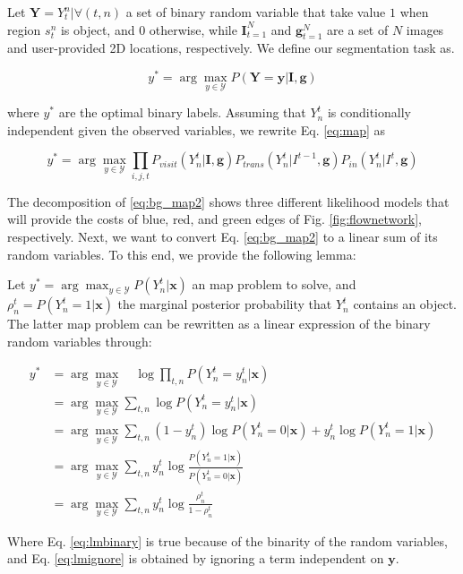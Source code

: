 Let $\bm{Y}={Y^{n}_{t}|\forall(t,n)}$ a set of binary random variable that take value $1$ when region $s^{n}_{t}$ is object, and $0$ otherwise, while $\bm{I}_{t=1}^{N}$ and $\bm{g}_{t=1}^{N}$ are a set of $N$ images and user-provided 2D locations, respectively.
We define our segmentation task as.

\begin{equation}
  \label{eq:map}
  y^{*} = \arg \max_{y \in \mathcal{Y}}P(\bm{Y}=\bm{y}|\bm{I}, \bm{g})
\end{equation}

where $y^{*}$ are the optimal binary labels.
Assuming that $Y^{t}_{n}$ is conditionally independent given the observed variables, we rewrite Eq. \ref{eq:map} as

\begin{equation}
  \label{eq:bg_map2}
  y^{*} = \arg \max_{y \in \mathcal{Y}}\prod_{i,j,t} P_{visit}(Y^{t}_{n}|\bm{I}, \bm{g}) P_{trans}(Y^{t}_{n}|I^{t-1},\bm{g}) P_{in}(Y^{t}_{n}|I^{t},\bm{g})
\end{equation}

The decomposition of \ref{eq:bg_map2} shows three different likelihood models that will provide the costs of blue, red, and green edges of Fig. \ref{fig:flownetwork}, respectively.
Next, we want to convert Eq. \ref{eq:bg_map2} to a linear sum of its random variables.
To this end, we provide the following lemma:

\begin{lemma}
  \label{lm:linprog}
  Let $y^{*}=\arg\max_{y\in\mathcal{Y}}P(Y^{t}_{n}|\bm{x})$ an \gls{map} problem to solve, and $\rho^{t}_{n}=P(Y^{t}_{n}=1|\bm{x})$ the marginal posterior probability that $Y^{t}_{n}$ contains an object.
  The latter \gls{map} problem can be rewritten as a linear expression of the binary random variables through:

  \begin{align}
    y^{*} &= \arg \max_{y\in\mathcal{Y}} \quad \log \prod_{t,n} P(Y^{t}_{n}=y^{t}_{n}|\bm{x})\\
          &= \arg \max_{y\in\mathcal{Y}} \sum_{t,n} \log P(Y^{t}_{n}=y^{t}_{n}|\bm{x}) \\
    &= \arg \max_{y\in\mathcal{Y}} \sum_{t,n} (1-y^{t}_{n})\log P(Y^{t}_{n}=0|\bm{x}) + y^{t}_{n}\log P(Y^{t}_{n}=1|\bm{x}) \label{eq:lmbinary}\\
    &= \arg \max_{y\in\mathcal{Y}} \sum_{t,n} y^{t}_{n}\log \frac{P(Y^{t}_{n}=1|\bm{x})}{P(Y^{t}_{n}=0|\bm{x})} \label{eq:lmignore}\\
    &= \arg \max_{y\in\mathcal{Y}} \sum_{t,n} y^{t}_{n}\log \frac{\rho^{t}_{n}}{1-\rho^{t}_{n}}
  \end{align}

Where Eq. \ref{eq:lmbinary} is true because of the binarity of the random variables, and Eq. \ref{eq:lmignore} is obtained by ignoring a term independent on $\bm{y}$.
\end{lemma}

